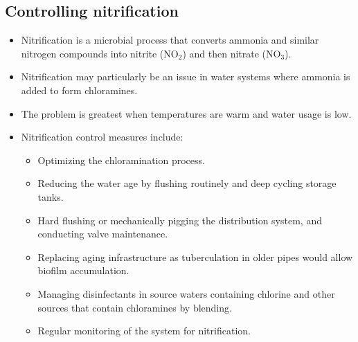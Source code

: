 \subsection{Controlling nitrification} 
\begin{itemize}
\item Nitrification is a microbial process that converts ammonia and similar nitrogen compounds into nitrite (NO$_2$) and then nitrate (NO$_3$).
\item Nitrification may particularly be an issue in water systems where ammonia is added to form chloramines.
\item The problem is greatest when temperatures are warm and water usage is low.
\item Nitrification control measures include:
\begin{itemize}
\item Optimizing the chloramination process.
\item Reducing the water age by flushing routinely and deep cycling storage tanks.
\item Hard flushing or mechanically pigging the distribution system, and conducting valve maintenance.
\item Replacing aging infrastructure as tuberculation  in older pipes would allow biofilm accumulation.
\item Managing disinfectants in source waters containing chlorine and other sources that contain chloramines by blending.
\item Regular monitoring of the system for nitrification.
\end{itemize}
\end{itemize}



